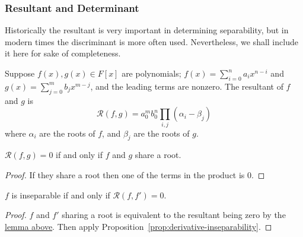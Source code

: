 \subsubsection*{Resultant and Determinant}

\begin{remark}
    Historically the resultant is very important in determining separability,
    but in modern times the discriminant is more often used.
    Nevertheless, we shall include it here for sake of completeness.
\end{remark}
\begin{definition}
    Suppose \(f(x),g(x) \in F[x]\) are polynomials;
    \(f(x) = \sum_{i=0}^n a_i x^{n-i}\) and \(g(x) = \sum_{j=0}^m b_j x^{m-j}\),
    and the leading terms are nonzero.
    The resultant of \(f\) and \(g\) is
    \begin{equation*}
        \mathcal{R}(f,g) = a_0^m b_0^n \prod_{i,j} (\alpha_i - \beta_j)
    \end{equation*}
    where \(\alpha_i\) are the roots of \(f\),
    and \(\beta_j\) are the roots of \(g\).
\end{definition}
\begin{lemma}\label{lem:resultant-zero}
    \(\mathcal{R}(f,g) = 0\) if and only if \(f\) and \(g\) share a root.
\end{lemma}
\begin{proof}
    If they share a root then one of the terms in the product is 0.
\end{proof}
\begin{corollary}
    \(f\) is inseparable if and only if \(\mathcal{R}(f,f') = 0\).
\end{corollary}
\begin{proof}
    \(f\) and \(f'\) sharing a root is equivalent to
    the resultant being zero by the \hyperref[lem:resultant-zero]{lemma above}.
    Then apply Proposition~\ref{prop:derivative-inseparability}.
\end{proof}
